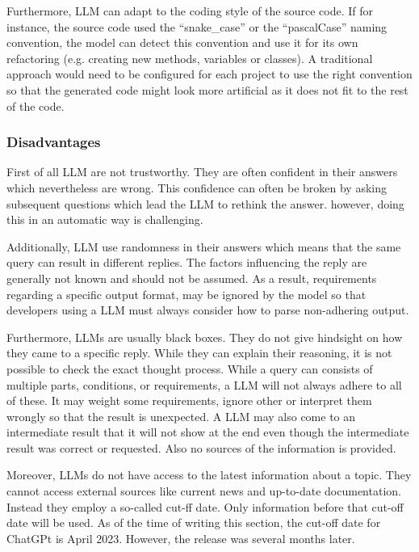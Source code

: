 Furthermore, \ac{LLM} can adapt to the coding style of the source code. If for instance, the source code used the \enquote{snake\_case} or the \enquote{pascalCase} naming convention, the model can detect this convention and use it for its own refactoring (e.g. creating new methods, variables or classes). A traditional approach would need to be configured for each project to use the right convention so that the generated code might look more artificial as it does not fit to the rest of the code.


\subsubsection{Disadvantages}

First of all \ac{LLM} are not trustworthy. They are often confident in their answers which nevertheless are wrong. This confidence can often be broken by asking subsequent questions which lead the \ac{LLM} to rethink the answer. however, doing this in an automatic way is challenging.

Additionally, \ac{LLM} use randomness in their answers which means that the same query can result in different replies. The factors influencing the reply are generally not known and should not be assumed. As a result, requirements regarding a specific output format, may be ignored by the model so that developers using a \ac{LLM} must always consider how to parse non-adhering output. 

Furthermore, \ac{LLM}s are usually black boxes. They do not give hindsight on how they came to a specific reply. While they can explain their reasoning, it is not possible to check the exact thought process.
While a query can consists of multiple parts, conditions, or requirements, a \ac{LLM} will not always adhere to all of these. It may weight some requirements, ignore other or interpret them wrongly so that the result is unexpected. A \ac{LLM} may also come to an intermediate result that it will not show at the end even though the intermediate result was correct or requested. Also no sources of the information is provided. 

Moreover, \ac{LLM}s do not have access to the latest information about a topic. They cannot access external sources like current news  and up-to-date documentation. Instead they employ a so-called cut-ff date. Only information before that cut-off date will be used. As of the time of writing this section, the cut-off date for ChatGPt is April  2023. However, the release was several months later.  

